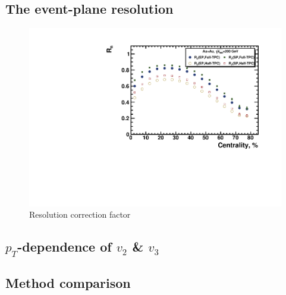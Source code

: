 \FloatBarrier
\subsection{The event-plane resolution}

\begin{figure}[ht]
    \centering
    \includegraphics[width=0.7\linewidth]{Figures/ResSPFullHalfvn.pdf}
    \caption{Resolution correction factor}
    \label{fig:res_SP}
\end{figure}

\FloatBarrier
\subsection{$p_{T}$-dependence of $v_2$ \& $v_3$}

\FloatBarrier
\subsection{Method comparison}